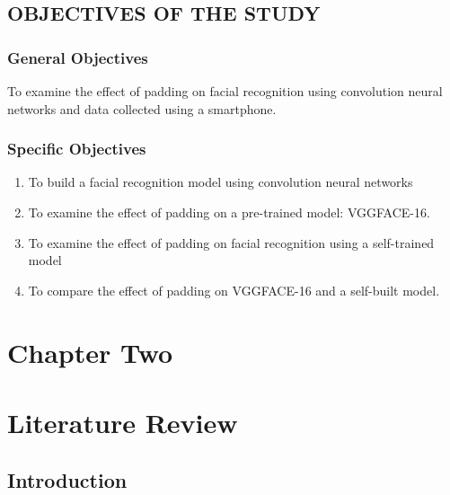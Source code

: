 \documentclass[
  12pt,
]{report}
\providecommand{\tightlist}{%
  \setlength{\itemsep}{0pt}\setlength{\parskip}{0pt}}
\begin{document}
\section{OBJECTIVES OF THE STUDY}\label{objectives-of-the-study}

\subsection{General Objectives}\label{general-objectives}

To examine the effect of padding on facial recognition using convolution
neural networks and data collected using a smartphone.

\subsection{Specific Objectives}\label{specific-objectives}

\begin{enumerate}
\def\labelenumi{\arabic{enumi}.}
\tightlist
\item
  To build a facial recognition model using convolution neural networks
\item
  To examine the effect of padding on a pre-trained model: VGGFACE-16.
\item
  To examine the effect of padding on facial recognition using a
  self-trained model
\item
  To compare the effect of padding on VGGFACE-16 and a self-built model.
\end{enumerate}

\newpage

\onehalfspacing
\normalsize
\justifying

\chapter{Chapter Two}\label{chapter-two}

\vspace{-0.1em}

\chapter*{Literature Review}\label{literature-review}

\vspace{-0.1em}

\section{Introduction}\label{introduction-1}
\end{document}
